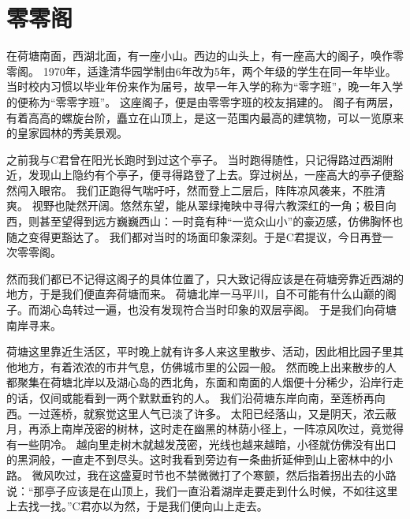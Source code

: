 \chapter{零零阁}

在荷塘南面，西湖北面，有一座小山。西边的山头上，有一座高大的阁子，唤作零零阁。%
1970年，适逢清华园学制由6年改为5年，两个年级的学生在同一年毕业。
当时校内习惯以毕业年份来作为届号，故早一年入学的称为“零字班”，晚一年入学的便称为“零零字班”。
这座阁子，便是由零零字班的校友捐建的。
阁子有两层，有着高高的螺旋台阶，矗立在山顶上，是这一范围内最高的建筑物，可以一览原来的皇家园林的秀美景观。

之前我与C君曾在阳光长跑时到过这个亭子。
当时跑得随性，只记得路过西湖附近，发现山上隐约有个亭子，便寻得路登了上去。穿过树丛，一座高大的亭子便豁然闯入眼帘。
我们正跑得气喘吁吁，然而登上二层后，阵阵凉风袭来，不胜清爽。
视野也陡然开阔。悠然东望，能从翠绿掩映中寻得六教深红的一角；极目向西，则甚至望得到远方巍巍西山：一时竟有种“一览众山小”的豪迈感，仿佛胸怀也随之变得更豁达了。
我们都对当时的场面印象深刻。于是C君提议，今日再登一次零零阁。

然而我们都已不记得这阁子的具体位置了，只大致记得应该是在荷塘旁靠近西湖的地方，于是我们便直奔荷塘而来。
荷塘北岸一马平川，自不可能有什么山巅的阁子。而湖心岛转过一遍，也没有发现符合当时印象的双层亭阁。
于是我们向荷塘南岸寻来。

荷塘这里靠近生活区，平时晚上就有许多人来这里散步、活动，因此相比园子里其他地方，有着浓浓的市井气息，仿佛城市里的公园一般。
然而晚上出来散步的人都聚集在荷塘北岸以及湖心岛的西北角，东面和南面的人烟便十分稀少，沿岸行走的话，仅间或能看到一两个默默垂钓的人。
我们沿荷塘东岸向南，至莲桥再向西。一过莲桥，就察觉这里人气已淡了许多。
太阳已经落山，又是阴天，浓云蔽月，再添上南岸茂密的树林，这时走在幽黑的林荫小径上，一阵凉风吹过，竟觉得有一些阴冷。
越向里走树木就越发茂密，光线也越来越暗，小径就仿佛没有出口的黑洞般，一直走不到尽头。这时我看到旁边有一条曲折延伸到山上密林中的小路。
微风吹过，我在这盛夏时节也不禁微微打了个寒颤，然后指着拐出去的小路说：“那亭子应该是在山顶上，我们一直沿着湖岸走要走到什么时候，不如往这里上去找一找。”C君亦以为然，于是我们便向山上走去。

